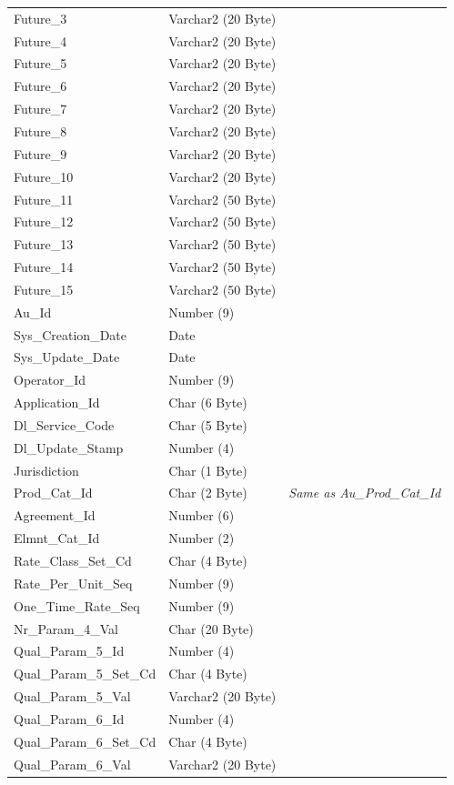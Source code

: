 \documentclass[12pt,twoside]{article}
\begin{document}
\begin{longtable}{l|l|l}
Future\_3 & Varchar2 (20 Byte) & \\
Future\_4 & Varchar2 (20 Byte) & \\
Future\_5 & Varchar2 (20 Byte) & \\
Future\_6 & Varchar2 (20 Byte) & \\
Future\_7 & Varchar2 (20 Byte) & \\
Future\_8 & Varchar2 (20 Byte) & \\
Future\_9 & Varchar2 (20 Byte) & \\
Future\_10 & Varchar2 (20 Byte) & \\
Future\_11 & Varchar2 (50 Byte) & \\
Future\_12 & Varchar2 (50 Byte) & \\
Future\_13 & Varchar2 (50 Byte) & \\
Future\_14 & Varchar2 (50 Byte) & \\
Future\_15 & Varchar2 (50 Byte) & \\
Au\_Id & Number (9) & \\
Sys\_Creation\_Date & Date & \\
Sys\_Update\_Date & Date & \\
Operator\_Id & Number (9) & \\
Application\_Id & Char (6 Byte) & \\
Dl\_Service\_Code & Char (5 Byte) & \\
Dl\_Update\_Stamp & Number (4) & \\
Jurisdiction & Char (1 Byte) & \\
Prod\_Cat\_Id & Char (2 Byte) & \emph{Same as Au\_Prod\_Cat\_Id}\\
Agreement\_Id & Number (6) & \\
Elmnt\_Cat\_Id & Number (2) & \\
Rate\_Class\_Set\_Cd & Char (4 Byte) & \\
Rate\_Per\_Unit\_Seq & Number (9) & \\
One\_Time\_Rate\_Seq & Number (9) & \\
Nr\_Param\_4\_Val & Char (20 Byte) & \\
Qual\_Param\_5\_Id & Number (4) & \\
Qual\_Param\_5\_Set\_Cd & Char (4 Byte) & \\
Qual\_Param\_5\_Val & Varchar2 (20 Byte) & \\
Qual\_Param\_6\_Id & Number (4) & \\
Qual\_Param\_6\_Set\_Cd & Char (4 Byte) & \\
Qual\_Param\_6\_Val & Varchar2 (20 Byte) & \\

\end{longtable}
\end{document}
